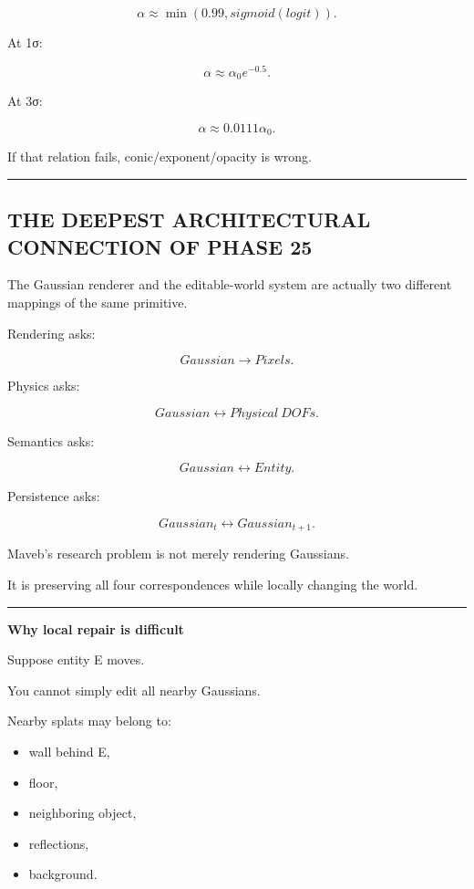 \[
\alpha\approx
\min(
0.99,
sigmoid(logit)).
\]

At 1σ:

\[
\alpha
\approx
\alpha_0e^{-0.5}.
\]

At 3σ:

\[
\alpha
\approx
0.0111\alpha_0.
\]

If that relation fails, conic/exponent/opacity is wrong.

\begin{center}\rule{0.5\linewidth}{0.5pt}\end{center}

\subsection{THE DEEPEST ARCHITECTURAL CONNECTION OF PHASE 25}\label{06-engine-ii-ch045-the-deepest-architectural-connection-of-phase-25}

The Gaussian renderer and the editable-world system are actually two different mappings of the same primitive.

Rendering asks:

\[
\boxed{
Gaussian
\rightarrow
Pixels.
}
\]

Physics asks:

\[
\boxed{
Gaussian
\leftrightarrow
Physical\ DOFs.
}
\]

Semantics asks:

\[
\boxed{
Gaussian
\leftrightarrow
Entity.
}
\]

Persistence asks:

\[
\boxed{
Gaussian_t
\leftrightarrow
Gaussian_{t+1}.
}
\]

Maveb's research problem is not merely rendering Gaussians.

It is preserving all four correspondences while locally changing the world.

\begin{center}\rule{0.5\linewidth}{0.5pt}\end{center}

\textbf{Why local repair is difficult}

Suppose entity E moves.

You cannot simply edit all nearby Gaussians.

Nearby splats may belong to:

\begin{itemize}
\tightlist
\item
  wall behind E,
\item
  floor,
\item
  neighboring object,
\item
  reflections,
\item
  background.
\end{itemize}

